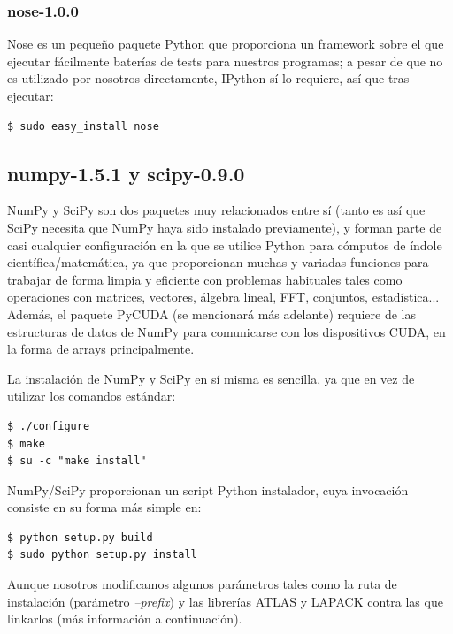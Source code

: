 \documentclass[twoside]{article}
\begin{document}
\subsubsection{nose-1.0.0}

Nose es un pequeño paquete Python que proporciona un framework sobre el que ejecutar fácilmente baterías de tests para nuestros programas; a pesar de que no es utilizado por nosotros directamente, IPython sí lo requiere, así que tras ejecutar:

\begin{verbatim}
$ sudo easy_install nose
\end{verbatim}

\subsection{numpy-1.5.1 y scipy-0.9.0}
NumPy y SciPy son dos paquetes muy relacionados entre sí (tanto es así que SciPy necesita que NumPy haya sido instalado previamente), y forman parte de casi cualquier configuración en la que se utilice Python para cómputos de índole científica/matemática, ya que proporcionan muchas y variadas funciones para trabajar de forma limpia y eficiente con problemas habituales tales como operaciones con matrices, vectores, álgebra lineal, FFT, conjuntos, estadística... Además, el paquete PyCUDA (se mencionará más adelante) requiere de las estructuras de datos de NumPy para comunicarse con los dispositivos CUDA, en la forma de arrays principalmente.

\vspace{5 mm}

La instalación de NumPy y SciPy en sí misma es sencilla, ya que en vez de utilizar los comandos estándar:

\begin{verbatim}
$ ./configure
$ make
$ su -c "make install"
\end{verbatim}

NumPy/SciPy proporcionan un script Python instalador, cuya invocación consiste en su forma más simple en:

\begin{verbatim}
$ python setup.py build
$ sudo python setup.py install
\end{verbatim}

Aunque nosotros modificamos algunos parámetros tales como la ruta de instalación (parámetro \emph{--prefix}) y las librerías ATLAS y LAPACK contra las que linkarlos (más información a continuación).
\end{document}
